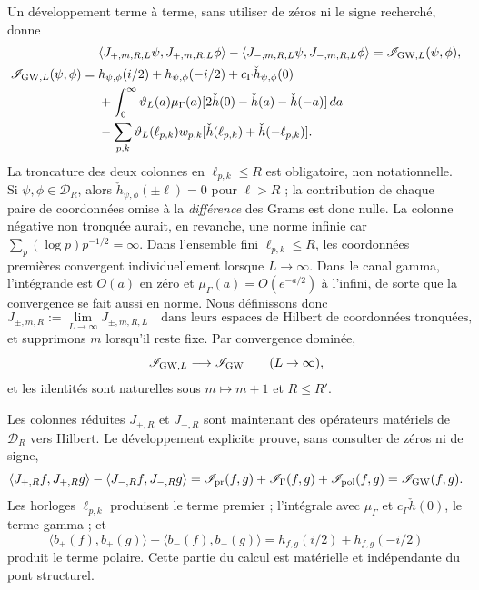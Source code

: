 Un développement terme à terme, sans utiliser de zéros ni le signe recherché, donne
\begin{align*}
 &\langle J_{+,m,R,L}\psi,J_{+,m,R,L}\phi\rangle
 -\langle J_{-,m,R,L}\psi,J_{-,m,R,L}\phi\rangle
 =\mathscr I_{{\rm GW},L}(\psi,\phi),\\
 \mathscr I_{{\rm GW},L}(\psi,\phi)
 ={}&h_{\psi,\phi}(i/2)+h_{\psi,\phi}(-i/2)
 +c_\Gamma\check h_{\psi,\phi}(0)\\
 &+\int_0^\infty\vartheta_L(a)\mu_\Gamma(a)
 [2\check h(0)-\check h(a)-\check h(-a)]\,da\\
 &-\sum_{p,k}\vartheta_L(\ell_{p,k})w_{p,k}
 [\check h(\ell_{p,k})+\check h(-\ell_{p,k})].
\end{align*}
La troncature des deux colonnes en \(\ell_{p,k}\leq R\) est obligatoire, non
notationnelle. Si \(\psi,\phi\in\mathcal D_R\), alors
\(\check h_{\psi,\phi}(\pm\ell)=0\) pour \(\ell>R\) ; la contribution de chaque
paire de coordonnées omise à la \emph{différence} des Grams est donc nulle.
La colonne négative non tronquée aurait, en revanche, une norme infinie car
\(\sum_p(\log p)p^{-1/2}=\infty\). Dans l'ensemble fini
\(\ell_{p,k}\leq R\), les coordonnées premières convergent individuellement lorsque
\(L\to\infty\). Dans le canal gamma, l'intégrande est \(O(a)\) en zéro et
\(\mu_\Gamma(a)=O(e^{-a/2})\) à l'infini, de sorte que la convergence se fait aussi
en norme. Nous définissons donc
\begin{equation}\label{eq:pdf2-rh-columnas-reducidas}
 J_{\pm,m,R}:=\lim_{L\to\infty}J_{\pm,m,R,L}
 \quad\text{dans leurs espaces de Hilbert de coordonnées tronquées},
\end{equation}
et supprimons \(m\) lorsqu'il reste fixe. Par convergence dominée,
\[
 \mathscr I_{{\rm GW},L}\longrightarrow\mathscr I_{\rm GW}
 \qquad(L\to\infty),
\]
et les identités sont naturelles sous $m\mapsto m+1$ et $R\le R'$.

Les colonnes réduites \(J_{+,R}\) et \(J_{-,R}\) sont maintenant des opérateurs
matériels de \(\mathcal D_R\) vers Hilbert. Le développement explicite prouve, sans
consulter de zéros ni de signe,
\begin{equation}\label{eq:pdf2-rh-gram-difference-gw}
 \langle J_{+,R}f,J_{+,R}g\rangle
 -\langle J_{-,R}f,J_{-,R}g\rangle
 =\mathscr I_{\rm pr}(f,g)+\mathscr I_\Gamma(f,g)
  +\mathscr I_{\rm pol}(f,g)
 =\mathscr I_{\rm GW}(f,g).
\end{equation}
Les horloges \(\ell_{p,k}\) produisent le terme premier ; l'intégrale avec
\(\mu_\Gamma\) et \(c_\Gamma\check h(0)\), le terme gamma ; et
\[
 \langle b_+(f),b_+(g)\rangle-
 \langle b_-(f),b_-(g)\rangle
 =h_{f,g}(i/2)+h_{f,g}(-i/2)
\]
produit le terme polaire. Cette partie du calcul est matérielle et indépendante
du pont structurel.

